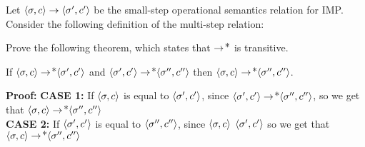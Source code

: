 \documentclass[11pt]{article}
\begin{document}
\begin{exercise}
Let $\CONFIG{\sigma}{c} \stepsone \CONFIG{\sigma'}{c'}$ be the
small-step operational semantics relation for IMP. Consider the
following definition of the multi-step relation:

\begin{mathpar}

\end{mathpar}

\noindent Prove the following theorem, which states that
$\stepsone\kleenestar$ is transitive.

\begin{theorem*} If \( \CONFIG{\sigma}{c} \stepsone\kleenestar
\CONFIG{\sigma'}{c'} \) and \( \CONFIG{\sigma'}{c'}
\stepsone\kleenestar \CONFIG{\sigma''}{c''} \) then \(
\CONFIG{\sigma}{c} \stepsone\kleenestar \CONFIG{\sigma''}{c''} \).
\end{theorem*}

\noindent \textbf{Proof:} \textbf{CASE 1:} If $\CONFIG{\sigma}{c}$ is equal to $\CONFIG{\sigma'}{c'}$, since $\CONFIG{\sigma'}{c'} \stepsone\kleenestar \CONFIG{\sigma''}{c''}$, so we get that $\CONFIG{\sigma}{c} \stepsone\kleenestar \CONFIG{\sigma''}{c''}$\\

\noindent \textbf{CASE 2:} If $\CONFIG{\sigma'}{c'}$ is equal to $\CONFIG{\sigma''}{c''}$, since $\CONFIG{\sigma}{c}$ \stepsone\kleenestar $\CONFIG{\sigma'}{c'}$ so we get that $\CONFIG{\sigma}{c} \stepsone\kleenestar \CONFIG{\sigma''}{c''}$\\


\end{exercise}
\end{document}
